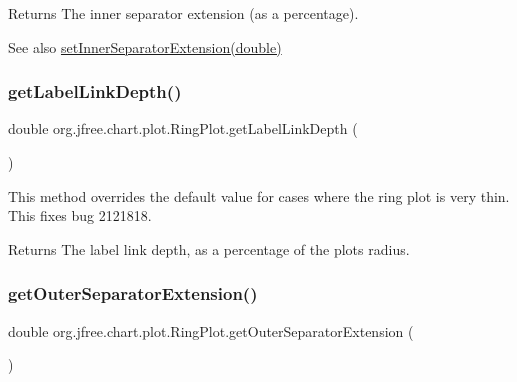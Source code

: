 \begin{DoxyReturn}{Returns}
The inner separator extension (as a percentage).
\end{DoxyReturn}
\begin{DoxySeeAlso}{See also}
\mbox{\hyperlink{classorg_1_1jfree_1_1chart_1_1plot_1_1_ring_plot_ad2e08a53e400d8fed0d516222276db69}{set\+Inner\+Separator\+Extension(double)}} 
\end{DoxySeeAlso}
\mbox{\label{classorg_1_1jfree_1_1chart_1_1plot_1_1_ring_plot_a8fbcbaa4e5d9d50a5206319add39ae2d}} 
\subsubsection{\texorpdfstring{get\+Label\+Link\+Depth()}{getLabelLinkDepth()}}
{\footnotesize\ttfamily double org.\+jfree.\+chart.\+plot.\+Ring\+Plot.\+get\+Label\+Link\+Depth (\begin{DoxyParamCaption}{ }\end{DoxyParamCaption})\hspace{0.3cm}{\ttfamily [protected]}}

This method overrides the default value for cases where the ring plot is very thin. This fixes bug 2121818.

\begin{DoxyReturn}{Returns}
The label link depth, as a percentage of the plot\textquotesingle{}s radius. 
\end{DoxyReturn}
\mbox{\label{classorg_1_1jfree_1_1chart_1_1plot_1_1_ring_plot_a98c30bad9e360b42056a9614fa04de17}} 
\subsubsection{\texorpdfstring{get\+Outer\+Separator\+Extension()}{getOuterSeparatorExtension()}}
{\footnotesize\ttfamily double org.\+jfree.\+chart.\+plot.\+Ring\+Plot.\+get\+Outer\+Separator\+Extension (\begin{DoxyParamCaption}{ }\end{DoxyParamCaption})}

